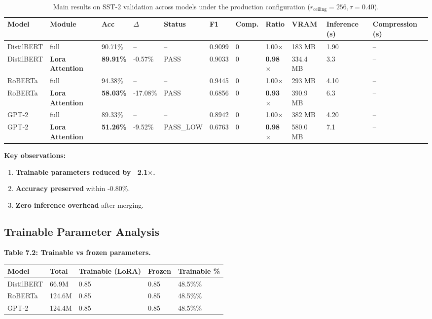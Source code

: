 \begin{table}[t]
\centering
\small
\begin{tabular}{lllllllllll}
\toprule
\textbf{Model} & \textbf{Module} & \textbf{Acc} & \textbf{$\Delta$} & \textbf{Status} & \textbf{F1} & \textbf{Comp.} & \textbf{Ratio} & \textbf{VRAM} & \textbf{Inference (s)} & \textbf{Compression (s)} \\
\midrule
DistilBERT & full & 90.71\% & -- & -- & 0.9099 & 0 & 1.00$\times$ & 183 MB & 1.90 & -- \\
DistilBERT & \textbf{Lora Attention} & \textbf{89.91\%} & -0.57\% & PASS & 0.9033 & 0 & \textbf{0.98$\times$} & 334.4 MB & 3.3 & -- \\
RoBERTa & full & 94.38\% & -- & -- & 0.9445 & 0 & 1.00$\times$ & 293 MB & 4.10 & -- \\
RoBERTa & \textbf{Lora Attention} & \textbf{58.03\%} & -17.08\% & PASS & 0.6856 & 0 & \textbf{0.93$\times$} & 390.9 MB & 6.3 & -- \\
GPT-2 & full & 89.33\% & -- & -- & 0.8942 & 0 & 1.00$\times$ & 382 MB & 4.20 & -- \\
GPT-2 & \textbf{Lora Attention} & \textbf{51.26\%} & -9.52\% & PASS\_LOW & 0.6763 & 0 & \textbf{0.98$\times$} & 580.0 MB & 7.1 & -- \\
\bottomrule
\end{tabular}
\caption{Main results on SST-2 validation across models under the production configuration ($r_{\mathrm{ceiling}}=256, \tau=0.40$).}
\label{tab:main_sst2}
\end{table}

\textbf{Key observations:}

\begin{enumerate}
\item \textbf{Trainable parameters reduced by ~2.1$\times$.}
\item \textbf{Accuracy preserved} within -0.80\%.
\item \textbf{Zero inference overhead} after merging.

\end{enumerate}
\subsection{Trainable Parameter Analysis}

\textbf{Table 7.2: Trainable vs frozen parameters.}

\begin{table}[H]
\centering
\small
\begin{tabular}{lllll}
\toprule
\textbf{Model} & \textbf{Total} & \textbf{Trainable (LoRA)} & \textbf{Frozen} & \textbf{Trainable \%} \\
\midrule
DistilBERT & 66.9M & 0.85 & 0.85 & 48.5\%\% \\
RoBERTa & 124.6M & 0.85 & 0.85 & 48.5\%\% \\
GPT-2 & 124.4M & 0.85 & 0.85 & 48.5\%\% \\
\bottomrule
\end{tabular}
\end{table}

